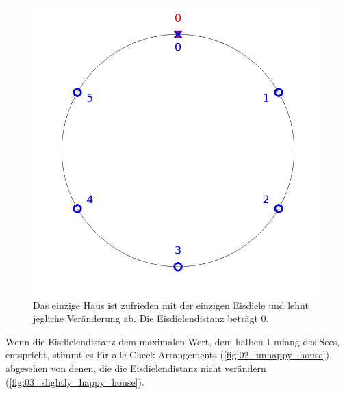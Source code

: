 \documentclass[a4paper,10pt,ngerman,captions=figureheading]{scrartcl}
\newcommand{\imageWidth}{0.3\linewidth}
\begin{document}
\begin{figure}[h!t]
    \centering
    \caption{Das einzige Haus ist zufrieden mit der einzigen Eisdiele und lehnt jegliche Veränderung ab. Die Eisdielendistanz beträgt $0$.}
    \label{fig:01_hapy_house}
    \includegraphics[width=\imageWidth]{01_happy_house.png}
\end{figure}

Wenn die Eisdielendistanz dem maximalen Wert, dem halben Umfang des Sees, entspricht, stimmt es für alle Check-Arrangements (\autoref{fig:02_unhappy_house}), abgesehen von denen, die die Eisdielendistanz nicht verändern (\autoref{fig:03_slightly_happy_house}).
\end{document}
